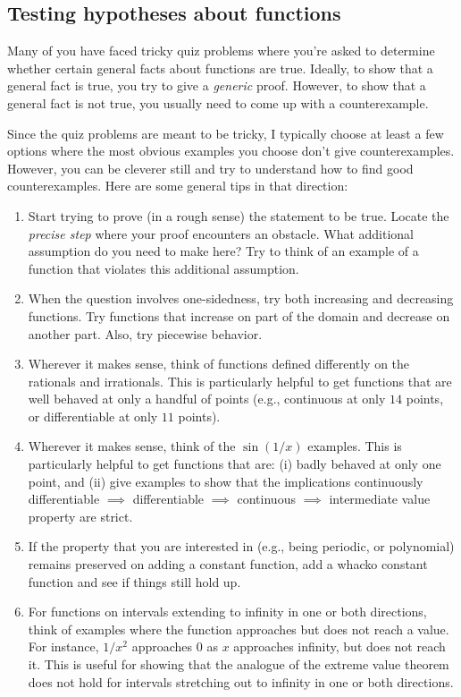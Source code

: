 \documentclass[10pt]{amsart}
\begin{document}
\subsection{Testing hypotheses about functions}

Many of you have faced tricky quiz problems where you're asked to
determine whether certain general facts about functions are
true. Ideally, to show that a general fact is true, you try to give a
{\em generic} proof. However, to show that a general fact is not true,
you usually need to come up with a counterexample.

Since the quiz problems are meant to be tricky, I typically choose at
least a few options where the most obvious examples you choose don't
give counterexamples. However, you can be cleverer still and try to
understand how to find good counterexamples. Here are some general
tips in that direction:

\begin{enumerate}
\item Start trying to prove (in a rough sense) the statement to be
  true. Locate the {\em precise step} where your proof encounters an
  obstacle. What additional assumption do you need to make here? Try
  to think of an example of a function that violates this additional
  assumption.
\item When the question involves one-sidedness, try both increasing
  and decreasing functions. Try functions that increase on part of the
  domain and decrease on another part. Also, try piecewise behavior.
\item Wherever it makes sense, think of functions defined differently
  on the rationals and irrationals. This is particularly helpful to
  get functions that are well behaved at only a handful of points
  (e.g., continuous at only $14$ points, or differentiable at only
  $11$ points).
\item Wherever it makes sense, think of the $\sin(1/x)$ examples. This
  is particularly helpful to get functions that are: (i) badly behaved
  at only one point, and (ii) give examples to show that the implications
  continuously differentiable $\implies$ differentiable $\implies$
  continuous $\implies$ intermediate value property are strict.
\item If the property that you are interested in (e.g., being
  periodic, or polynomial) remains preserved on adding a constant
  function, add a whacko constant function and see if things still
  hold up.
\item For functions on intervals extending to infinity in one or both
  directions, think of examples where the function approaches but does
  not reach a value. For instance, $1/x^2$ approaches $0$ as $x$
  approaches infinity, but does not reach it. This is useful for
  showing that the analogue of the extreme value theorem does not hold
  for intervals stretching out to infinity in one or both directions.
\end{enumerate}
\end{document}
